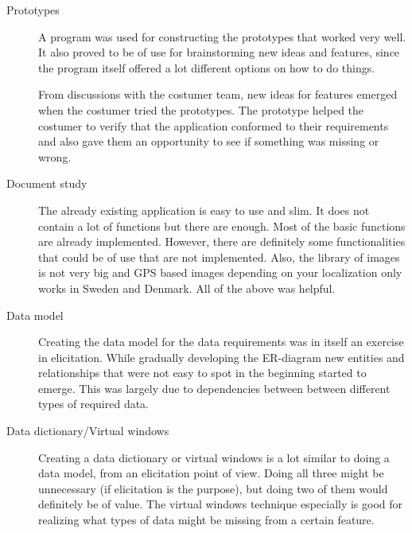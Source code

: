 \documentclass[10pt,a4paper]{article}
\begin{document}
\begin{description}
\item[Prototypes] A program was used for constructing the prototypes that worked very well. It also proved to be of use for brainstorming new ideas and features, since the program itself offered a lot different options on how to do things. 

From discussions with the costumer team, new ideas for features emerged when the costumer tried the prototypes. The prototype helped the costumer to verify that the application conformed to their requirements and also gave them an opportunity to see if something was missing or wrong.

\item[Document study] The already existing application is easy to use and slim. It does not contain a lot of functions but there are enough. Most of the basic functions are already implemented. However, there are definitely some functionalities that could be of use that are not implemented. Also, the library of images is not very big and GPS based images depending on your localization only works in Sweden and Denmark. All of the above was helpful.

\item[Data model] Creating the data model for the data requirements was in itself an exercise in elicitation. While gradually developing the ER-diagram new entities and relationships that were not easy to spot in the beginning started to emerge. This was largely due to dependencies between between different types of required data.

\item[Data dictionary/Virtual windows] Creating a data dictionary or virtual windows is a lot similar to doing a data model, from an elicitation point of view. Doing all three might be unnecessary (if elicitation is the purpose), but doing two of them would definitely be of value. The virtual windows technique especially is good for realizing what types of data might be missing from a certain feature.
\end{description}
\end{document}
